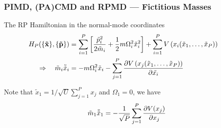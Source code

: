 \begin{frame}
  \frametitle{PIMD, (PA)CMD and RPMD --- Fictitious Masses}
  The RP Hamiltonian in the normal-mode coordinates
  \begin{align*}
    H_P(\{\mathbf{\tilde{x}}\}, \{\mathbf{\tilde{p}}\}) &=
    \sum_{i=1}^P
    \left[
      \frac{\tilde{p}_i^2}{2\tilde{m}_i}
      +
      \frac{1}{2} m \Omega_i^2 \tilde{x}_i^2
    \right]
      +
      \sum_{i=1}^P V\left(x_i(\tilde{x}_1,\ldots,\tilde{x}_P)\right) \cr
      \Rightarrow \quad
      \tilde{m}_i \ddot{\tilde{x}}_i &=
                           -m
                           \tikzmark{RPOmega}\Omega_i^2
                           \tilde{x}_i
                           - \sum_{j=1}^P
                           {
                           \partial
                           V\left(x_j(\tilde{x}_1,\ldots,\tilde{x}_P)\right)
                           \over
                           \partial
                           \tilde{x_i} \tikzmark{RPPot}
                           }
  \end{align*}


  Note that $\tilde{x}_1 = 1/\sqrt{U} \sum_{j=1}^P x_j$ and $\Omega_1 = 0$, we have
  \begin{equation*}
      \tilde{m}_1 \ddot{\tilde{x}}_1 =
      - {1\over\sqrt{P}} \sum_{j=1}^P {\partial V(x_j) \over \partial x_j}
  \end{equation*}


\end{frame}

